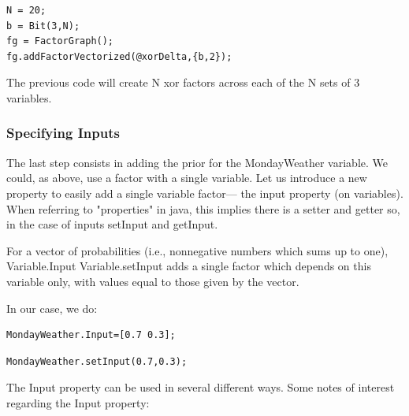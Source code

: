 \begin{lstlisting}
N = 20;
b = Bit(3,N);
fg = FactorGraph();
fg.addFactorVectorized(@xorDelta,{b,2});
\end{lstlisting}

The previous code will create N xor factors across each of the N sets of 3 variables.

\fi

\subsubsection*{Specifying Inputs}


The last step consists in adding the prior for the MondayWeather variable. We could, as above, use a factor with a single variable. Let us introduce a new property to easily add a single variable factor--- the input property (on variables).  \ifjava When referring to "properties" in java, this implies there is a setter and getter so, in the case of inputs setInput and getInput. \fi

For a vector of probabilities (i.e., nonnegative numbers which sums up to one), \ifmatlab Variable.Input \fi \ifjava Variable.setInput \fi adds a single factor which depends on this variable only, with values equal to those given by the vector.

In our case, we do:

\ifmatlab

\begin{lstlisting}
MondayWeather.Input=[0.7 0.3];
\end{lstlisting}

\fi

\ifjava

\begin{lstlisting}
MondayWeather.setInput(0.7,0.3);
\end{lstlisting}

\fi

The Input property can be used in several different ways. Some notes of interest regarding the Input property:


